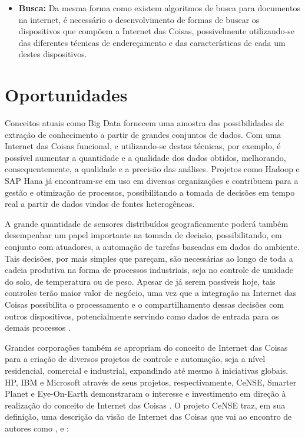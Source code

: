 \documentclass[twoside,english,brazilian]{UNISINOSmonografia}
\begin{document}
\begin{itemize}
	\item \textbf{Busca:}
Da mesma forma como existem algoritmos de busca para documentos na internet, 
é necessário o desenvolvimento de formas de buscar os dispositivos que compõem 
a Internet das Coisas, possivelmente utilizando-se das diferentes técnicas de 
endereçamento e das características de cada um destes dispositivos.
	
\end{itemize}




\section{Oportunidades}

Conceitos atuais como Big Data fornecem uma amostra das possibilidades de 
extração de conhecimento a partir de grandes conjuntos de dados. 
Com uma Internet das Coisas funcional, e utilizando-se destas técnicas, por exemplo,
é possível aumentar a quantidade e a 
qualidade dos dados obtidos, melhorando, consequentemente, a 
qualidade e a precisão das análises.
Projetos como Hadoop e SAP Hana já encontram-se em uso em diversas 
organizações e contribuem para a gestão e otimização de processos, 
possibilitando a tomada de decisões em tempo real a partir de dados 
vindos de fontes heterogêneas.


A grande quantidade de sensores distribuídos geograficamente poderá também 
desempenhar um papel importante na tomada de decisão, possibilitando, 
em conjunto com atuadores, a automação de tarefas baseadas em dados do 
ambiente.
Tais decisões, por mais simples que pareçam, são necessárias ao longo de toda 
a cadeia produtiva na forma de processos industriais, seja no controle de 
umidade do solo, de temperatura ou de peso.
Apesar de já serem possíveis hoje, tais controles terão maior valor de negócio, 
uma vez que a integração na Internet das Coisas possibilita o processamento e 
o compartilhamento dessas decisões com outros dispositivos, potencialmente 
servindo como dados de entrada para os demais processos \cite{ITU2005}.


Grandes corporações também se apropriam do conceito de Internet das Coisas 
para a criação de diversos projetos de controle e automação, seja a nível 
residencial, comercial e industrial, expandindo até mesmo à iniciativas 
globais.
HP, IBM e Microsoft através de seus projetos, respectivamente, CeNSE, Smarter 
Planet e Eye-On-Earth demonstraram o interesse e investimento em direção à 
realização do conceito de Internet das Coisas \cite{Coetzee2011}.
O projeto CeNSE traz, em sua definição, uma descrição da visão de Internet das 
Coisas que vai ao encontro de autores como , 
 e :
\end{document}
